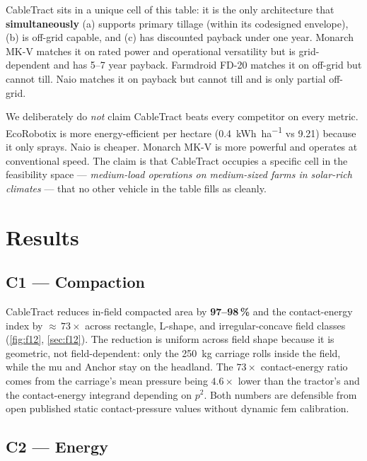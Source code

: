 \documentclass[11pt,a4paper]{article}
\begin{document}
CableTract sits in a unique cell of this table: it is the only architecture that \textbf{simultaneously} (a) supports primary tillage (within its codesigned envelope), (b) is off-grid capable, and (c) has discounted payback under one year. Monarch MK-V matches it on rated power and operational versatility but is grid-dependent and has 5--7 year payback. Farmdroid FD-20 matches it on off-grid but cannot till. Naio matches it on payback but cannot till and is only partial off-grid.

We deliberately do \emph{not} claim CableTract beats every competitor on every metric. EcoRobotix is more energy-efficient per hectare (\SI{0.4}{\kWh\per\hectare} vs 9.21) because it only sprays. Naio is cheaper. Monarch MK-V is more powerful and operates at conventional speed. The claim is that CableTract occupies a specific cell in the feasibility space --- \emph{medium-load operations on medium-sized farms in solar-rich climates} --- that no other vehicle in the table fills as cleanly.

\section{Results}\label{sec:results}

\subsection{C1 --- Compaction}\label{sec:r-c1}

CableTract reduces in-field compacted area by \textbf{97--98\,\%} and the contact-energy index by \textbf{${\approx}\,73\times$} across rectangle, L-shape, and irregular-concave field classes (\cref{fig:f12}, \cref{sec:f12}). The reduction is uniform across field shape because it is geometric, not field-dependent: only the \SI{250}{\kilogram} carriage rolls inside the field, while the \gls{mu} and Anchor stay on the headland. The $73\times$ contact-energy ratio comes from the carriage's mean pressure being $4.6\times$ lower than the tractor's and the contact-energy integrand depending on $p^{2}$. Both numbers are defensible from open published static contact-pressure values without dynamic \gls{fem} calibration.

\subsection{C2 --- Energy}\label{sec:r-c2}
\end{document}
